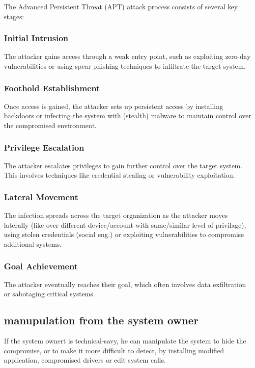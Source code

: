 The Advanced Persistent Threat (APT) attack process consists of several key stages:

\subsubsection{Initial Intrusion}
The attacker gains access through a weak entry point, such as exploiting zero-day vulnerabilities or using spear phishing techniques to infiltrate the target system.

\subsubsection{Foothold Establishment}
Once access is gained, the attacker sets up persistent access by installing backdoors or infecting the system with (stealth) malware to maintain control over the compromised environment.

\subsubsection{Privilege Escalation}
The attacker escalates privileges to gain further control over the target system. This involves techniques like credential stealing or vulnerability exploitation.

\subsubsection{Lateral Movement}
The infection spreads across the target organization as the attacker moves laterally (like over different device/account with same/similar level of privilage), using stolen credentials (social eng.) or exploiting vulnerabilities to compromise additional systems.

\subsubsection{Goal Achievement}
The attacker eventually reaches their goal, which often involves data exfiltration or sabotaging critical systems.

\subsection{manupulation from the system owner}
If the system ownert is technical-savy, he can manipulate the system to hide the compromise, or to make it more difficult to detect, by installing modified application, compromised drivers or edit system calls.

